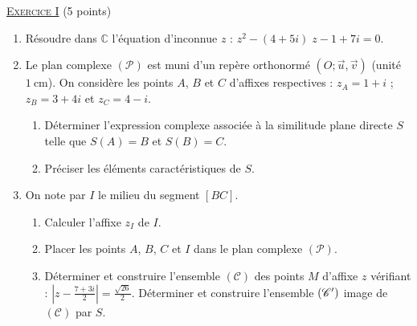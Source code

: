 \providecommand{\Courbe}{(\mathscr{C})}
\providecommand{\D}{(\mathscr{D})}
\providecommand{\Plan}{(\mathscr{P})}
\providecommand{\Ouv}{(O ; \vec{u} , \vec{v})}
\providecommand{\cm}{~\mathrm{cm}}
\providecommand{\dx}{~\mathrm{d}x}
\providecommand{\Arg}[1]{\mathrm{Arg}\left( #1 \right)}
\providecommand{\Angl}[2]{\left( \overrightarrow{#1} ; \overrightarrow{#2} \right)}
\noindent \underline{\textsc{Exercice I}} (5 points)
      \begin{enumerate}
            \item R\'esoudre dans $\mathbb{C}$ l'\'equation d'inconnue $z$ : $z^2 - (4 + 5i) \; z - 1 + 7 i = 0$.
            \item Le plan complexe $\Plan$ est muni d'un rep\`ere orthonorm\'e $\Ouv$ (unit\'e $1 \cm$).
                  On consid\`ere les points $A$, $B$ et $C$ d'affixes respectives : 
                  $z_A = 1 + i$ ; $z_B = 3 + 4 i$ et $z_C = 4 - i$.
                  \begin{enumerate}
                        \item D\'eterminer l'expression complexe associ\'ee \`a la similitude plane directe $S$ telle que 
                              $S(A) = B$ et $S(B) = C$.
                        \item Pr\'eciser les \'el\'ements caract\'eristiques de $S$.
                  \end{enumerate}
            \item On note par $I$ le milieu du segment $[BC]$.
                  \begin{enumerate}
                        \item Calculer l'affixe $z_I$ de $I$.
                        \item Placer les points $A$, $B$, $C$ et $I$ dans le plan complexe $\Plan$.
                        \item D\'eterminer et construire l'ensemble $\Courbe$ des points $M$ d'affixe $z$ v\'erifiant :
                              $\displaystyle{
                                    \left|
                                          z - \frac{7 + 3 i}{2}
                                    \right|
                                           = \frac{\sqrt{26}}{2} 
                              }$.
                              D\'eterminer et construire l'ensemble $(\mathscr{C}')$ image de $\Courbe$ par $S$.
                  \end{enumerate}
      \end{enumerate}
